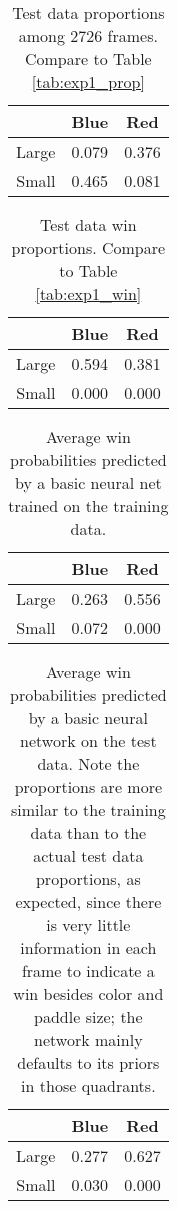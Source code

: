 \documentclass{article}
\begin{document}
\begin{table}
\centering
\begin{tabular}{r | c | c}
 & Blue & Red \\
\hline
Large & 0.079 & 0.376 \\
\hline
Small & 0.465 & 0.081
\end{tabular}
\caption{Test data proportions among 2726 frames. Compare to Table \ref{tab:exp1_prop}}
\label{tab:exp1_test_prop}
\end{table}


\begin{table}
\centering
\begin{tabular}{r | c | c}
 & Blue & Red \\
\hline
Large & 0.594 & 0.381 \\
\hline
Small & 0.000 & 0.000
\end{tabular}
\caption{Test data win proportions. Compare to Table \ref{tab:exp1_win}}
\label{tab:exp1_test_win}
\end{table}

\begin{table}
\centering
\begin{tabular}{r | c | c}
 & Blue & Red \\
\hline
Large & 0.263 & 0.556 \\
\hline
Small & 0.072 & 0.000
\end{tabular}
\caption{Average win probabilities predicted by a basic neural net trained on the training data.}
\label{tab:exp1_model}
\end{table}

\begin{table}
\centering
\begin{tabular}{r | c | c}
 & Blue & Red \\
\hline
Large & 0.277 & 0.627 \\
\hline
Small & 0.030 & 0.000
\end{tabular}
\caption{Average win probabilities predicted by a basic neural network on the test data. Note the proportions are more similar to the training data than to the actual test data proportions, as expected, since there is very little information in each frame to indicate a win besides color and paddle size; the network mainly defaults to its priors in those quadrants.}
\label{tab:exp1_test_win}
\end{table}
\end{document}
